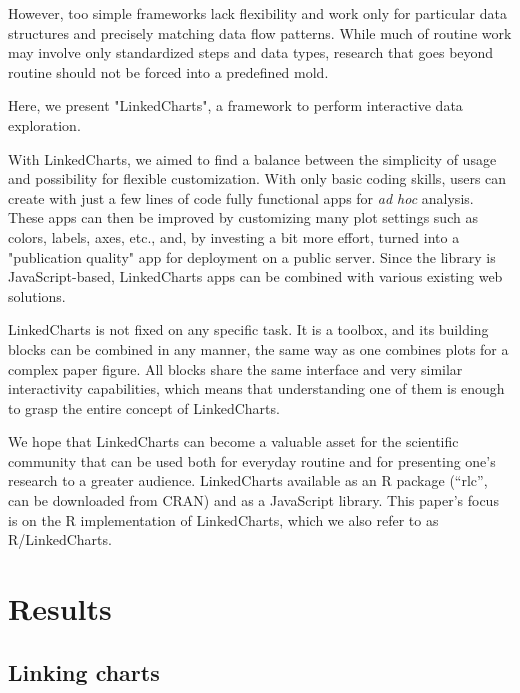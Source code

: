 \documentclass[twocolumn,10pt]{article}
\begin{document}
However, too simple frameworks lack flexibility and work only for particular data structures and precisely matching data flow patterns. While much of routine work may involve only standardized steps and data types, research that goes beyond routine should not be forced into a predefined mold.

Here, we present "LinkedCharts", a framework to perform interactive data exploration. 

With LinkedCharts, we aimed to find a balance between the simplicity of usage and possibility for flexible customization. With only basic coding skills, users can create with just a few lines of code fully functional apps for \emph{ad hoc} analysis. These apps can then be improved by customizing many plot settings such as colors, labels, axes, etc., and, by investing a bit more effort, turned into a "publication quality" app for deployment on a public server. Since the library is JavaScript-based, LinkedCharts apps can be combined with various existing web solutions.

LinkedCharts is not fixed on any specific task. It is a toolbox, and its building blocks can be combined in any manner, the same way as one combines plots for a complex paper figure. All blocks share the same interface and very similar interactivity capabilities, which means that understanding one of them is enough to grasp the entire concept of LinkedCharts.

We hope that LinkedCharts can become a valuable asset for the scientific community that can be used both for everyday routine and for presenting one's research to a greater audience. LinkedCharts available as an R package (``rlc'', can be downloaded from CRAN) and as a JavaScript library. This paper's focus is on the R implementation of LinkedCharts, which we also refer to as R/LinkedCharts. 

\section{Results}

\subsection{Linking charts}
\end{document}
